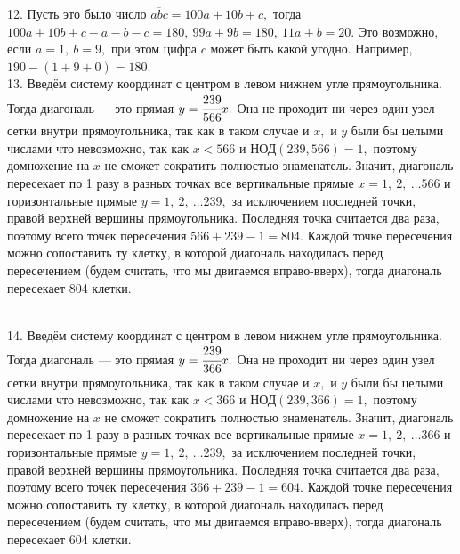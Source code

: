 \documentclass[12pt]{article}
\begin{document}
12. Пусть это было число $\overline{abc}=100a+10b+c,$ тогда $100a+10b+c-a-b-c=180,\ 99a+9b=180,\ 11a+b=20.$ Это возможно, если $a=1,\ b=9,$ при этом цифра $c$ может быть какой угодно. Например, $190-(1+9+0)=180.$\\
13. Введём систему координат с центром в левом нижнем угле прямоугольника. Тогда диагональ --- это прямая $y=\cfrac{239}{566}x.$ Она не проходит ни через один узел сетки внутри прямоугольника, так как в таком случае и $x,$ и $y$ были бы целыми числами что невозможно, так как $x<566$ и $\text{НОД}(239,566)=1,$ поэтому домножение на $x$ не сможет сократить полностью знаменатель. Значит, диагональ пересекает по 1 разу в разных точках все вертикальные прямые $x=1,\ 2,\ \ldots 566$ и горизонтальные прямые $y=1,\ 2,\ \ldots 239,$ за исключением последней точки, правой верхней вершины прямоугольника. Последняя точка считается два раза, поэтому всего точек пересечения $566+239-1=804.$ Каждой точке пересечения можно сопоставить ту клетку, в которой диагональ находилась перед пересечением (будем считать, что мы двигаемся вправо-вверх), тогда диагональ пересекает 804 клетки.
\begin{figure}[ht!]
\end{figure}\\
14. Введём систему координат с центром в левом нижнем угле прямоугольника. Тогда диагональ --- это прямая $y=\cfrac{239}{366}x.$ Она не проходит ни через один узел сетки внутри прямоугольника, так как в таком случае и $x,$ и $y$ были бы целыми числами что невозможно, так как $x<366$ и $\text{НОД}(239,366)=1,$ поэтому домножение на $x$ не сможет сократить полностью знаменатель. Значит, диагональ пересекает по 1 разу в разных точках все вертикальные прямые $x=1,\ 2,\ \ldots 366$ и горизонтальные прямые $y=1,\ 2,\ \ldots 239,$ за исключением последней точки, правой верхней вершины прямоугольника. Последняя точка считается два раза, поэтому всего точек пересечения $366+239-1=604.$ Каждой точке пересечения можно сопоставить ту клетку, в которой диагональ находилась перед пересечением (будем считать, что мы двигаемся вправо-вверх), тогда диагональ пересекает 604 клетки.
\end{document}
